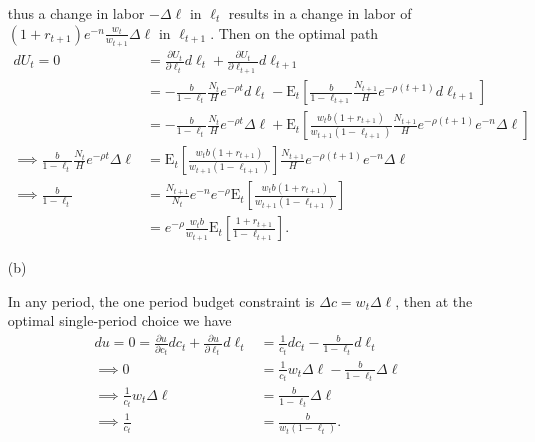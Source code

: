 \documentclass{article}
\newcommand{\Et}[1]{\mathrm{E}_t\left[#1\right]}
\begin{document}
\begin{itemize}
        thus a change in labor $-\Delta \ell$ in $\ell_t$ results in a change in labor of $(1+r_{t+1})e^{-n}\frac{w_t}{w_{t+1}} \Delta \ell$ in $\ell_{t+1}$. Then on the optimal path
        \begin{align}
            dU_t = 0
            &= \frac{\partial U_t}{\partial \ell_t} d \ell_t
            + \frac{\partial U_t}{\partial \ell_{t+1}} d \ell_{t+1}
            \\
            &= -\frac{b}{1 - \ell_t}\frac{N_t}{H}e^{-\rho t} d \ell_t
            -\Et{\frac{b}{1 - \ell_{t+1}}\frac{N_{t+1}}{H}e^{-\rho (t+1)} d \ell_{t+1}}
            \\
            &= -\frac{b}{1 - \ell_t}\frac{N_t}{H}e^{-\rho t} \Delta \ell
            + \Et{\frac{w_t b (1+r_{t+1})}{w_{t+1}(1 - \ell_{t+1})}\frac{N_{t+1}}{H}e^{-\rho (t+1)}e^{-n} \Delta \ell}
            \\
            \implies
            \frac{b}{1 - \ell_t}\frac{N_t}{H}e^{-\rho t} \Delta \ell
            &= \Et{\frac{w_t b (1+r_{t+1})}{w_{t+1} (1 - \ell_{t+1})}}\frac{N_{t+1}}{H}e^{-\rho (t+1)}e^{-n} \Delta \ell
            \\
            \implies
            \frac{b}{1 - \ell_t}
            &= \frac{N_{t+1}}{N_t} e^{-n} e^{-\rho} \Et{\frac{w_t b (1+r_{t+1})}{w_{t+1}(1-\ell_{t+1})}}
            \\
            &= e^{-\rho} \frac{w_t b}{w_{t+1}}\Et{\frac{1+r_{t+1}}{1 - \ell_{t+1}}}.
        \end{align}
        
        \item[(b)]
        
        In any period, the one period budget constraint is $\Delta c = w_t \Delta \ell$, then at the optimal single-period choice we have
        \begin{align}
            d u = 0
            = \frac{\partial u}{\partial c_t} d c_t + \frac{\partial u}{\partial \ell_t} d \ell_t
            &= \frac{1}{c_t} dc_t
            - \frac{b}{1 - \ell_t} d\ell_t
            \\
            \implies 0 &= \frac{1}{c_t} w_t \Delta \ell
            - \frac{b}{1 - \ell_t} \Delta \ell
            \\
            \implies
            \frac{1}{c_t} w_t \Delta \ell
            &= \frac{b}{1 - \ell_t} \Delta \ell
            \\
            \implies
            \frac{1}{c_t}
            &= \frac{b}{w_t(1 - \ell_t)}.
        \end{align}
        

\end{itemize}
\end{document}
